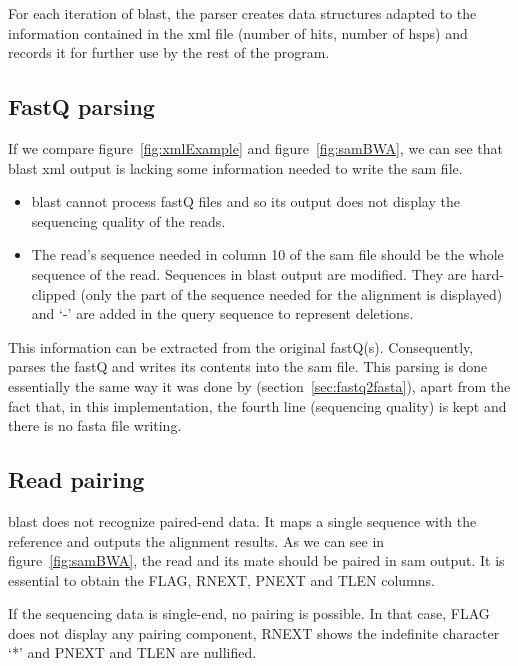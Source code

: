For each iteration of \gls{blast}, the parser creates data structures adapted to the information contained in the \gls{xml} file (number of hits, number of \glspl{hsp}) and records it for further use by the rest of the program.


\subsection{FastQ parsing}
If we compare figure~\ref{fig:xmlExample} and figure~\ref{fig:samBWA}, we can see that \gls{blast} \gls{xml} output is lacking some information needed to write the \gls{sam} file.
\begin{itemize}
    \item \gls{blast} cannot process fastQ files and so its output does not display the sequencing quality of the reads.
    \item The read's sequence needed in column 10 of the \gls{sam} file should be the whole sequence of the read. Sequences in \gls{blast} output are modified. They are hard-clipped (only the part of the sequence needed for the alignment is displayed) and `-' are added in the query sequence to represent deletions.
\end{itemize}

This information can be extracted from the original fastQ(s). Consequently, \blastobam{} parses the fastQ and writes its contents into the \gls{sam} file.
This parsing is done essentially the same way it was done by \fastqtofasta{} (section~\ref{sec:fastq2fasta}), apart from the fact that, in this implementation, the fourth line (sequencing quality) is kept and there is no fasta file writing.


\subsection{Read pairing}
\gls{blast} does not recognize paired-end data.
It maps a single sequence with the reference and outputs the alignment results.
As we can see in figure~\ref{fig:samBWA}, the read and its mate should be paired in \gls{sam} output.
It is essential to obtain the FLAG, RNEXT, PNEXT and TLEN columns.

If the sequencing data is single-end, no pairing is possible. In that case, FLAG does not display any pairing component, RNEXT shows the indefinite character `*' and PNEXT and TLEN are nullified.

